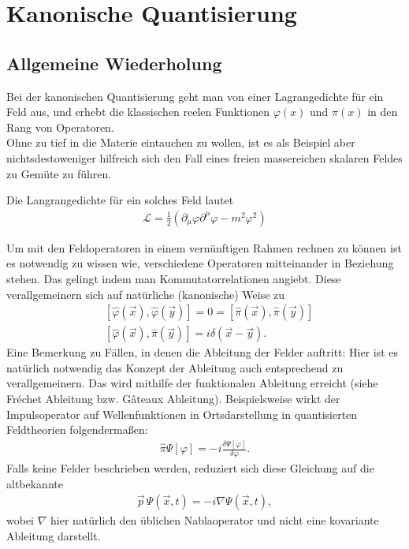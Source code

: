 \documentclass{scrartcl}
\begin{document}
	\section{Kanonische Quantisierung}
	\subsection{Allgemeine Wiederholung}
		Bei der kanonischen Quantisierung geht man von einer Lagrangedichte für ein 
		Feld aus, und erhebt die klassischen reelen Funktionen $\varphi(x)$ und $\pi(x)$ in
		den Rang von Operatoren.\\
		Ohne zu tief in die Materie eintauchen zu wollen, ist es als Beispiel aber nichtsdestoweniger
		hilfreich sich den Fall eines freien massereichen skalaren Feldes zu Gemüte zu führen.
		
		Die Langrangedichte für ein solches Feld lautet
		\begin{align}
			\mathcal{L}=\frac{1}{2}(\partial_\mu\varphi \partial^\mu\varphi-m^2\varphi^2)
		\end{align}
		
		Um mit den Feldoperatoren in einem vernünftigen Rahmen rechnen zu können
		ist es notwendig zu wissen wie, verschiedene Operatoren mitteinander in 
		Beziehung stehen. Das gelingt indem man Kommutatorrelationen angiebt.
		Diese verallgemeinern sich auf natürliche (kanonische) Weise zu
		\begin{align}
			&[\hat{\varphi}(\vec{x}), \hat{\varphi}(\vec{y})]=0=[\hat{\pi}(\vec{x}), \hat{\pi}(\vec{y})] \\
			&[\hat{\varphi}(\vec{x}), \hat{\pi}(\vec{y})]=i\delta(\vec{x}-\vec{y}).
		\end{align}
		Eine Bemerkung zu Fällen, in denen die Ableitung der Felder auftritt:
		Hier ist es natürlich notwendig das Konzept der Ableitung auch entsprechend
		zu verallgemeinern. Das wird mithilfe der funktionalen Ableitung erreicht
		(siehe Fr\'echet Ableitung bzw. G\^ateaux Ableitung).
		Beispielsweise wirkt der Impulsoperator auf Wellenfunktionen in Ortsdarstellung in quantisierten Feldtheorien folgendermaßen:
		\begin{align*}
			\hat{\pi}\Psi[\varphi]=-i\frac{\delta\Psi[\varphi]}{\delta \varphi}.
		\end{align*}
		Falls keine Felder beschrieben werden, reduziert sich diese Gleichung auf die altbekannte
		\begin{align*}
			\vec{p}\, \Psi(\vec{x},t)=-i\nabla \Psi(\vec{x},t),
		\end{align*}
		wobei $\nabla$ hier natürlich den üblichen Nablaoperator und nicht eine kovariante Ableitung darstellt.
\end{document}
